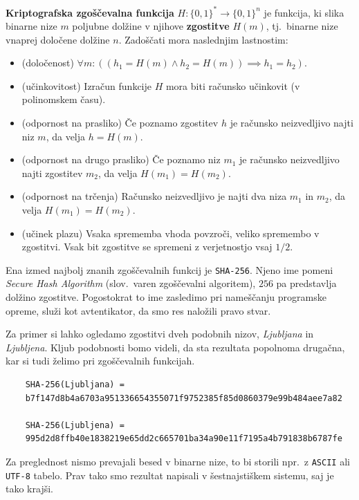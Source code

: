 \documentclass[isrm2, tisk]{fmfdelo}
\begin{document}
\begin{definicija} 
\label{def:hash}
    \textbf{Kriptografska zgoščevalna funkcija} $H: \{0, 1\}^* \rightarrow \{0, 1\}^n$ je funkcija, 
    ki slika binarne nize $m$ poljubne dolžine v njihove \textbf{zgostitve} $H(m)$, tj.\ binarne nize 
    vnaprej določene dolžine $n$. Zadoščati mora naslednjim lastnostim:
    \begin{itemize}
        \item (določenost) $\forall m: ((h_1 = H(m) \wedge h_2 = H(m)) \implies h_1 = h_2)$.
        \item (učinkovitost) Izračun funkcije $H$ mora biti računsko učinkovit (v polinomskem času).
        \item (odpornost na prasliko) Če poznamo zgostitev $h$ je računsko neizvedljivo najti 
            niz $m$, da velja $h = H(m)$.
        \item (odpornost na drugo prasliko) Če poznamo niz $m_1$ je računsko neizvedljivo najti 
            zgostitev $m_2$, da velja $H(m_1) = H(m_2)$.
        \item (odpornost na trčenja) Računsko neizvedljivo je najti dva niza $m_1$ in $m_2$, 
            da velja $H(m_1) = H(m_2)$.
        \item (učinek plazu) Vsaka sprememba vhoda povzroči, veliko spremembo v zgostitvi. 
            Vsak bit zgostitve se spremeni z verjetnostjo vsaj $1/2$.
    \end{itemize}
\end{definicija}

\begin{primer}
    Ena izmed najbolj znanih zgoščevalnih funkcij je \texttt{SHA-256}. Njeno ime pomeni \textit{Secure 
    Hash Algorithm} (slov.\ varen zgoščevalni algoritem), $256$ pa predstavlja dolžino zgostitve. 
    Pogostokrat to ime zasledimo pri nameščanju programske opreme, služi kot avtentikator, da smo res 
    naložili pravo stvar.

    Za primer si lahko ogledamo zgostitvi dveh podobnih nizov, \textit{Ljubljana} in \textit{Ljubljena}. 
    Kljub podobnosti bomo videli, da sta rezultata popolnoma drugačna, kar si tudi želimo pri zgoščevalnih 
    funkcijah.
    \begin{verbatim}
    SHA-256(Ljubljana) =
    b7f147d8b4a6703a951336654355071f9752385f85d0860379e99b484aee7a82

    SHA-256(Ljubljena) =
    995d2d8ffb40e1838219e65dd2c665701ba34a90e11f7195a4b791838b6787fe
    \end{verbatim}
    Za preglednost nismo prevajali besed v binarne nize, to bi storili npr.\ z \texttt{ASCII} ali \texttt{UTF-8}
    tabelo. Prav tako smo rezultat napisali v šestnajstiškem sistemu, saj je tako krajši.
\end{primer}
\end{document}
